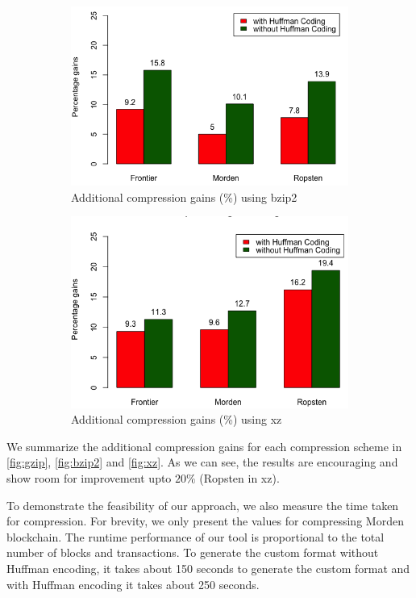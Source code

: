 \begin{figure}[H]
\begin{subfigure}{0.45\textwidth}
	\includegraphics[width=\textwidth]{plots/bzip2}
	\caption{Additional compression gains (\%) using bzip2}
	\label{fig:bzip2}
\end{subfigure}
\begin{subfigure}{0.45\textwidth}
	\includegraphics[width=\textwidth]{plots/xz}
	\caption{Additional compression gains (\%) using xz}
	\label{fig:xz}
\end{subfigure}
\caption{ }
\end{figure}
We summarize the additional compression gains for each compression scheme in \autoref{fig:gzip}, \autoref{fig:bzip2} and \autoref{fig:xz}.
As we can see, the results are encouraging and show room for improvement upto $20\%$ (Ropsten in xz).

To demonstrate the feasibility of our approach, we also measure the time taken for compression. 
For brevity, we only present the values for compressing Morden blockchain.
The runtime performance of our tool is proportional to the total number of blocks and transactions. 
To generate the custom format without Huffman encoding, it takes about 150 seconds to generate the custom format and with Huffman encoding it takes about 250 seconds. 



